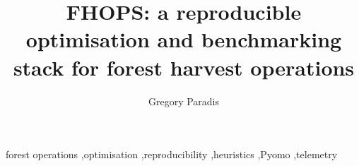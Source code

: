 \documentclass[preprint,review,12pt]{elsarticle}
\begin{document}
\begin{frontmatter}

\title{FHOPS: a reproducible optimisation and benchmarking stack for forest harvest operations}

\author[ubc]{Gregory Paradis}
\address[ubc]{Faculty of Forestry, University of British Columbia, Canada}





\begin{keyword}
forest operations \sep optimisation \sep reproducibility \sep heuristics \sep Pyomo \sep telemetry
\end{keyword}




\end{frontmatter}

\linenumbers










\end{document}
